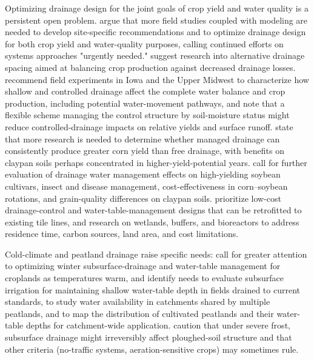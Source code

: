 Optimizing drainage design for the joint goals of crop yield and water quality is a persistent open problem. \textcite{Kladivko2021} argue that more field studies coupled with modeling are needed to develop site-specific recommendations and to optimize drainage design for both crop yield and water-quality purposes, calling continued efforts on systems approaches "urgently needed." \textcite{Zhao2016} suggest research into alternative drainage spacing aimed at balancing crop production against decreased drainage losses. \textcite{Singh2006b,Singh2007b} recommend field experiments in Iowa and the Upper Midwest to characterize how shallow and controlled drainage affect the complete water balance and crop production, including potential water-movement pathways, and note that a flexible scheme managing the control structure by soil-moisture status might reduce controlled-drainage impacts on relative yields and surface runoff. \textcite{Nash2015} state that more research is needed to determine whether managed drainage can consistently produce greater corn yield than free drainage, with benefits on claypan soils perhaps concentrated in higher-yield-potential years. \textcite{Nelson2011} call for further evaluation of drainage water management effects on high-yielding soybean cultivars, insect and disease management, cost-effectiveness in corn--soybean rotations, and grain-quality differences on claypan soils. \textcite{Dinnes2002} prioritize low-cost drainage-control and water-table-management designs that can be retrofitted to existing tile lines, and research on wetlands, buffers, and bioreactors to address residence time, carbon sources, land area, and cost limitations.

Cold-climate and peatland drainage raise specific needs: \textcite{Li2025} call for greater attention to optimizing winter subsurface-drainage and water-table management for croplands as temperatures warm, and \textcite{Läpikivi2025} identify needs to evaluate subsurface irrigation for maintaining shallow water-table depth in fields drained to current standards, to study water availability in catchments shared by multiple peatlands, and to map the distribution of cultivated peatlands and their water-table depths for catchment-wide application. \textcite{STEINHARDT1974} caution that under severe frost, subsurface drainage might irreversibly affect ploughed-soil structure and that other criteria (no-traffic systems, aeration-sensitive crops) may sometimes rule.

